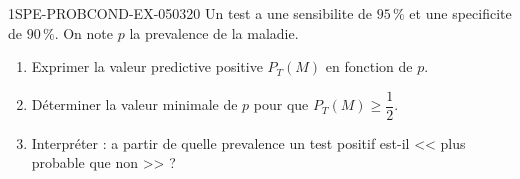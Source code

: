 \begin{exercice}{1SPE-PROBCOND-EX-050}{3}{20}
Un test a une sensibilite de $95\,\%$ et une specificite de $90\,\%$. On note $p$ la prevalence de la maladie.

\begin{enumerate}
  \item Exprimer la valeur predictive positive $P_T(M)$ en fonction de $p$.
  \item Déterminer la valeur minimale de $p$ pour que $P_T(M) \geq \dfrac{1}{2}$.
  \item Interpréter : a partir de quelle prevalence un test positif est-il << plus probable que non >> ?
\end{enumerate}
\end{exercice}
